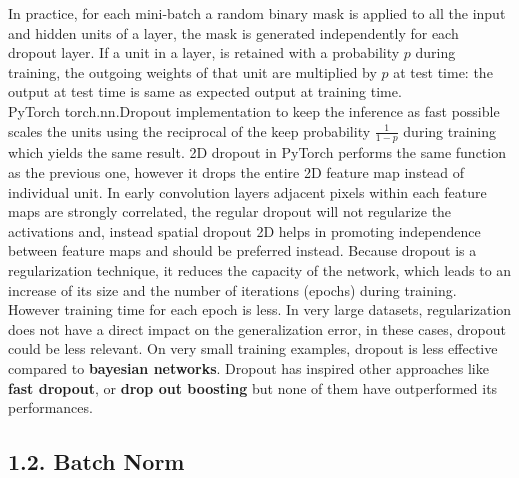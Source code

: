 \documentclass[11pt]{article}
\newcommand{\0}{\mat{0}}
\begin{document}
\begin{itemize}
In practice, for each mini-batch a random binary mask is applied to all the input and hidden units of a layer, the mask is generated independently for each dropout layer. If a unit in a layer, is retained with a probability $p$ during training, the outgoing weights of that unit are multiplied by $p$ at test time: the output at test time is same as expected output at training time.\\ PyTorch torch.nn.Dropout implementation to keep the inference as fast possible scales the units using the reciprocal of the keep probability $\frac{1}{1-p}$ during training which yields the same result. 2D dropout in PyTorch performs the same function as the previous one, however it drops the entire 2D feature map instead of individual unit. In early convolution layers adjacent pixels within each feature maps are strongly correlated, the regular dropout will not regularize the activations and, instead spatial dropout 2D helps in promoting independence between feature maps and should be preferred instead. Because dropout is a regularization technique, it reduces the capacity of the network, which leads to an increase of its size and the number of iterations (epochs) during training. However training time for each epoch is less. In very large datasets, regularization does not have a direct impact on the generalization error, in these cases, dropout could be less relevant. On very small training examples, dropout is less effective compared to \textbf{bayesian networks}. Dropout has inspired other approaches like \textbf{fast dropout}, or \textbf{drop out boosting} but none of them have outperformed its performances.
 

\end{itemize}
\subsection*{1.2. Batch Norm}
\end{document}
